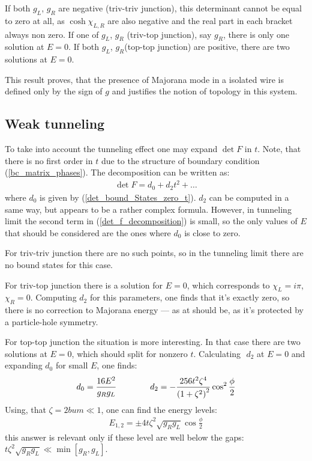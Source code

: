 If both $ g_L $, $ g_R $ are negative (triv-triv junction), this determinant cannot be equal to zero at all, as $ \cosh \chi_{L,R} $ are also negative and the real part in each bracket always non zero.  If one of $ g_L $, $ g_R $ (triv-top junction), say $ g_R $,	 there is only one solution at $ E=0 $. If both $ g_L $, $ g_R $(top-top junction) are positive, there are two solutions at $ E=0 $.

This result proves, that the presence of Majorana mode in a isolated wire is defined only by the sign of $ g $ and justifies the notion of  topology in this system.

\subsection{Weak tunneling}
To take into account the tunneling effect one may expand $ \det F $ in $ t $. Note, that there is no first order in $ t $ due to the structure of boundary condition (\ref{bc_matrix_phases}). The decomposition can be written as:
\begin{gather}
\label{det_f_decomposition}
	\det F
	=
	d_0
	+
	d_2t^2
	+
	\dots
\end{gather}
where $ d_0 $ is given by (\ref{det_bound_States_zero_t}). $ d_2 $ can be computed in a same way, but appears to be  a rather complex formula.  However, in tunneling limit the second term in (\ref{det_f_decomposition}) is small, so the only values of $ E $ that should be considered are the ones where $ d_0 $ is close to zero.

For triv-triv junction there are no such points, so in the tunneling limit there are no bound states for this case.

For triv-top junction there is a solution for $ E=0 $, which corresponds to $ \chi_L=i \pi $, $ \chi_R=0 $. Computing $ d_2 $ for this parameters, one finds that it's exactly zero, so there is no correction to Majorana energy --- as at should be, as it's protected by a particle-hole symmetry.

For top-top junction the situation is more interesting. In that case there are two solutions at $ E=0 $, which should split for nonzero $ t $. Calculating $  $ $ d_2 $ at $ E=0 $ and expanding $ d_0 $ for small $ E $, one finds:
\begin{gather}
d_0=\frac{16E^2}{g_Rg_L}
\qquad\qquad
	d_2 = -\frac{256t^2\zeta^4}{\left(1+\zeta^2\right)^2}\cos^2\frac{\phi}{2}
\end{gather}
Using, that $ \zeta=2bum\ll1 $, one can find the energy levels:
\begin{gather}
	E_{1,2}
	=
	\pm
	4t\zeta^2\sqrt{g_Rg_L}\cos\frac{\phi}{2}
\end{gather}
this answer is relevant only if these level are well below the gaps: $ t\zeta^2\sqrt{g_Rg_L}\ll\min\left[g_R,g_L\right] $.
